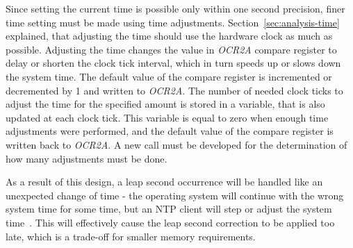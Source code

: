 Since setting the current time is possible only within one second precision,
finer time setting must be made using time adjustments.
Section~\ref{sec:analysis-time} explained, that adjusting the time
should use the hardware clock as much as possible.
Adjusting the time changes the value in {\it{OCR2A}} compare register
to delay or shorten the clock tick interval,
which in turn speeds up or slows down the system time.
The default value of the compare register is incremented or decremented by 1
and written to {\it{OCR2A}}.
The number of needed clock ticks to adjust the time for the specified amount
is stored in a variable, that is also updated at each clock tick.
This variable is equal to zero when enough time adjustments were performed,
and the default value of the compare register is written back to {\it{OCR2A}}.
A new call must be developed for the determination of how many adjustments must be done.

As a result of this design, a leap second occurrence will be handled like an unexpected change of time -
the operating system will continue with the wrong system time for some time,
but an NTP client will step or adjust the system time~\cite{ntp-faq}.
This will effectively cause the leap second correction to be applied too late,
which is a trade-off for smaller memory requirements.
